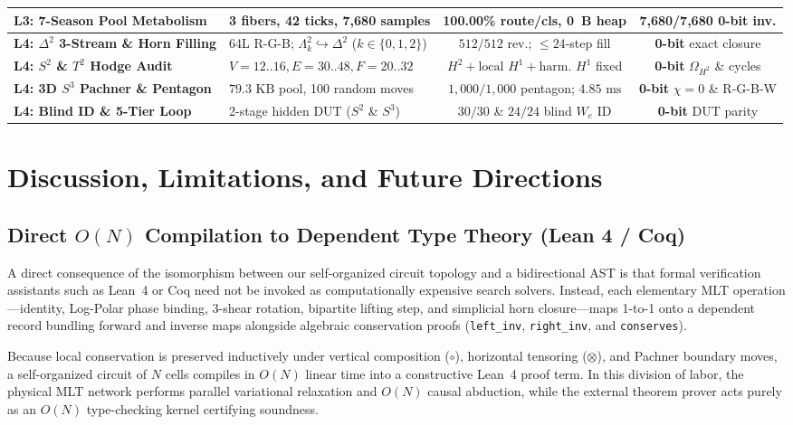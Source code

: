 \documentclass[11pt, a4paper]{article}
\begin{document}
\begin{table}[htbp]
\begin{tabularx}{\textwidth}{@{}lXcc@{}}
\textbf{L3: 7-Season Pool Metabolism} & 3 fibers, 42 ticks, 7,680 samples & \textbf{100.00\%} route/cls, \textbf{0~B} heap & \textbf{7,680/7,680} 0-bit inv. \\
\midrule
\textbf{L4: $\Delta^2$ 3-Stream \& Horn Filling} & 64L R-G-B; $\Lambda^2_k \hookrightarrow \Delta^2$ ($k \in \{0,1,2\}$) & $512/512$ rev.; $\le 24$-step fill & \textbf{0-bit} exact closure \\
\textbf{L4: $S^2$ \& $T^2$ Hodge Audit} & $V=12..16, E=30..48, F=20..32$ & $H^2 + \text{local } H^1 + \text{harm. } H^1$ fixed & \textbf{0-bit} $\Omega_{H^2}$ \& cycles \\
\textbf{L4: 3D $S^3$ Pachner \& Pentagon} & $79.3\text{ KB}$ pool, 100 random moves & $1,000/1,000$ pentagon; $4.85\text{ ms}$ & \textbf{0-bit} $\chi=0$ \& R-G-B-W \\
\textbf{L4: Blind ID \& 5-Tier Loop} & 2-stage hidden DUT ($S^2$ \& $S^3$) & $30/30$ \& $24/24$ blind $W_e$ ID & \textbf{0-bit} DUT parity \\
\bottomrule
\end{tabularx}
\end{table}

\section{Discussion, Limitations, and Future Directions}
\label{sec:discussion}

\subsection{Direct $O(N)$ Compilation to Dependent Type Theory (Lean 4 / Coq)}
A direct consequence of the isomorphism between our self-organized circuit topology and a bidirectional AST is that formal verification assistants such as Lean~4 or Coq need not be invoked as computationally expensive search solvers. Instead, each elementary MLT operation---identity, Log-Polar phase binding, 3-shear rotation, bipartite lifting step, and simplicial horn closure---maps 1-to-1 onto a dependent record bundling forward and inverse maps alongside algebraic conservation proofs (\texttt{left\_inv}, \texttt{right\_inv}, and \texttt{conserves}).

Because local conservation is preserved inductively under vertical composition ($\circ$), horizontal tensoring ($\otimes$), and Pachner boundary moves, a self-organized circuit of $N$ cells compiles in $O(N)$ linear time into a constructive Lean~4 proof term. In this division of labor, the physical MLT network performs parallel variational relaxation and $O(N)$ causal abduction, while the external theorem prover acts purely as an $O(N)$ type-checking kernel certifying soundness.
\end{document}
